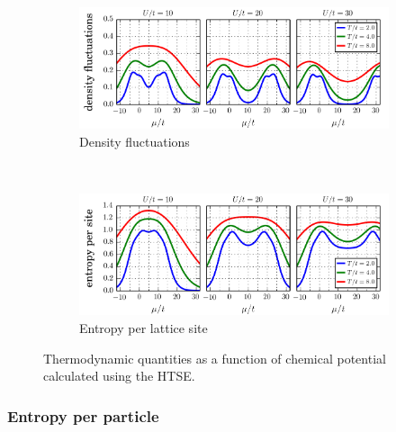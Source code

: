 \documentclass[11pt,letter]{article}
\begin{document}
\begin{figure}
        \begin{subfigure}[b]{0.49\textwidth}
                \includegraphics[width=\textwidth]{figures/HTSE_densfluc_U.png}
                \caption{Density fluctuations}
\label{fig:HTSEhomogeneousC}
        \end{subfigure}
        ~
        \begin{subfigure}[b]{0.49\textwidth}
                \includegraphics[width=\textwidth]{figures/HTSE_entropy_U.png}
                \caption{Entropy per lattice site}
\label{fig:HTSEhomogeneousD}
        \end{subfigure}
        \caption{Thermodynamic quantities as a function of chemical potential calculated using the HTSE.}
\label{fig:HTSEhomogeneous}
\end{figure}


\subsubsection{Entropy per particle}  
\end{document}
